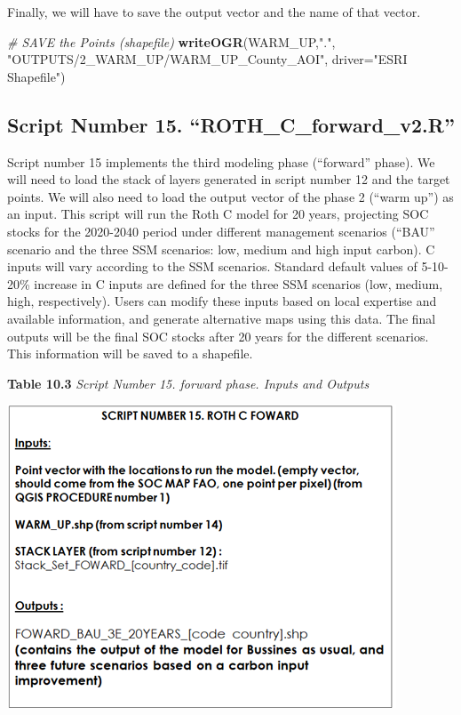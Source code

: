 \documentclass[
  10pt,
  b5paper,
]{book}
\newenvironment{Shaded}{\begin{snugshade}}{\end{snugshade}}
\newcommand{\CommentTok}[1]{\textcolor[rgb]{0.56,0.35,0.01}{\textit{#1}}}
\newcommand{\DataTypeTok}[1]{\textcolor[rgb]{0.13,0.29,0.53}{#1}}
\newcommand{\KeywordTok}[1]{\textcolor[rgb]{0.13,0.29,0.53}{\textbf{#1}}}
\newcommand{\NormalTok}[1]{#1}
\newcommand{\StringTok}[1]{\textcolor[rgb]{0.31,0.60,0.02}{#1}}
\begin{document}
Finally, we will have to save the output vector and the name of that vector.

\begin{Shaded}
\begin{Highlighting}[]
 \CommentTok{# SAVE the Points (shapefile) }
\KeywordTok{writeOGR}\NormalTok{(WARM_UP,}\StringTok{"."}\NormalTok{, }\StringTok{"OUTPUTS/2_WARM_UP/WARM_UP_County_AOI"}\NormalTok{, }\DataTypeTok{driver=}\StringTok{"ESRI Shapefile"}\NormalTok{)}
\end{Highlighting}
\end{Shaded}

\hypertarget{script-number-15.-roth_c_forward_v2.r}{%
\subsection{Script Number 15. ``ROTH\_C\_forward\_v2.R''}\label{script-number-15.-roth_c_forward_v2.r}}

Script number 15 implements the third modeling phase (``forward'' phase). We will need to load the stack of layers generated in script number 12 and the target points. We will also need to load the output vector of the phase 2 (``warm up'') as an input. This script will run the Roth C model for 20 years, projecting SOC stocks for the 2020-2040 period under different management scenarios (``BAU'' scenario and the three SSM scenarios: low, medium and high input carbon). C inputs will vary according to the SSM scenarios. Standard default values of 5-10-20\% increase in C inputs are defined for the three SSM scenarios (low, medium, high, respectively). Users can modify these inputs based on local expertise and available information, and generate alternative maps using this data. The final outputs will be the final SOC stocks after 20 years for the different scenarios. This information will be saved to a shapefile.

\textbf{Table 10.3} \emph{Script Number 15. forward phase. Inputs and Outputs}

\includegraphics{tables/Table_10.3.png}
\end{document}
